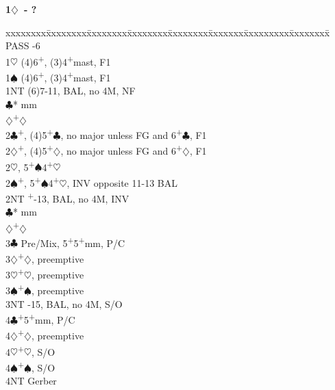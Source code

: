 \documentclass[10pt]{article}
\renewcommand{\c}{$\clubsuit$}
\renewcommand{\d}{$\diamondsuit$}
\newcommand{\h}{$\heartsuit$}
\newcommand{\s}{$\spadesuit$}
\newcommand{\p}{\textsuperscript{+}}
\newcommand{\m}{\textsuperscript{\textminus}}
\newenvironment{bidtable}[1][]
{\textbf{#1}
  \begin{adjustwidth}{1em}{}
    \addvspace{2pt}
    \begin{tabbing}
      xxxxxxxx\=xxxxxxxx\=xxxxxxxx\=xxxxxxxx\=xxxxxxxx\=xxxxxxx\=xxxxxxxxx\=xxxxxxxx\=\kill}
{\end{tabbing}\end{adjustwidth}\bigskip}%
\begin{document}
\begin{bidtable}[1\d\ - ?]
PASS      -6                                              \\
1\h       \> (4)6\p , (3)4\p mast, F1                         \\
1\s       \> (4)6\p , (3)4\p mast, F1                         \\
1NT       \> (6)7-11\m, BAL, no 4M, NF                        \\
          \c* {} mm                                    \\
          \d  {}\p\d                                    \\
2\c       {}\p, (4)5\p\c, no major unless FG and 6\p\c, F1 \\
2\d       {}\p, (4)5\p\d, no major unless FG and 6\p\d, F1 \\
2\h       {}\m, 5\p\s 4\p\h                               \\
2\s       {}\p, 5\p\s 4\p\h, INV opposite 11-13 BAL        \\
2NT       \p-13, BAL, no 4M, INV                         \\
          \c* {} mm                                    \\
          \d  {}\p\d                                    \\
3\c       \> Pre/Mix, 5\p 5\p mm, P/C                         \\
3\d       {}\p\d, preemptive                                \\
3\h       {}\p\h, preemptive                                \\
3\s       {}\p\s, preemptive                                \\
3NT       -15, BAL, no 4M, S/O                           \\
4\c       {}\p 5\p mm, P/C                                  \\
4\d       {}\p\d, preemptive                                \\
4\h       {}\p\h, S/O                                       \\
4\s       {}\p\s, S/O                                       \\
4NT       \> Gerber
\end{bidtable}
\end{document}
